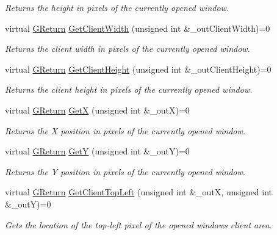 \begin{DoxyCompactItemize}
\begin{DoxyCompactList}\small\item\em Returns the height in pixels of the currently opened window. \end{DoxyCompactList}\item 
virtual \mbox{\hyperlink{namespaceGW_a67a839e3df7ea8a5c5686613a7a3de21}{G\+Return}} \mbox{\hyperlink{classGW_1_1SYSTEM_1_1GWindow_a6cedaf7ca08ed3519092196a8ae79784}{Get\+Client\+Width}} (unsigned int \&\+\_\+out\+Client\+Width)=0
\begin{DoxyCompactList}\small\item\em Returns the client width in pixels of the currently opened window. \end{DoxyCompactList}\item 
virtual \mbox{\hyperlink{namespaceGW_a67a839e3df7ea8a5c5686613a7a3de21}{G\+Return}} \mbox{\hyperlink{classGW_1_1SYSTEM_1_1GWindow_aca175a29d6e87e4d4ed848325216c8f1}{Get\+Client\+Height}} (unsigned int \&\+\_\+out\+Client\+Height)=0
\begin{DoxyCompactList}\small\item\em Returns the client height in pixels of the currently opened window. \end{DoxyCompactList}\item 
virtual \mbox{\hyperlink{namespaceGW_a67a839e3df7ea8a5c5686613a7a3de21}{G\+Return}} \mbox{\hyperlink{classGW_1_1SYSTEM_1_1GWindow_a61da1f01be5fa48df2375701ed0062e9}{GetX}} (unsigned int \&\+\_\+outX)=0
\begin{DoxyCompactList}\small\item\em Returns the X position in pixels of the currently opened window. \end{DoxyCompactList}\item 
virtual \mbox{\hyperlink{namespaceGW_a67a839e3df7ea8a5c5686613a7a3de21}{G\+Return}} \mbox{\hyperlink{classGW_1_1SYSTEM_1_1GWindow_a58d456c963afd1b4d9235a1336d57754}{GetY}} (unsigned int \&\+\_\+outY)=0
\begin{DoxyCompactList}\small\item\em Returns the Y position in pixels of the currently opened window. \end{DoxyCompactList}\item 
virtual \mbox{\hyperlink{namespaceGW_a67a839e3df7ea8a5c5686613a7a3de21}{G\+Return}} \mbox{\hyperlink{classGW_1_1SYSTEM_1_1GWindow_ac80bfaba809d5eb54d6a11b11deddeb7}{Get\+Client\+Top\+Left}} (unsigned int \&\+\_\+outX, unsigned int \&\+\_\+outY)=0
\begin{DoxyCompactList}\small\item\em Gets the location of the top-\/left pixel of the opened window\textquotesingle{}s client area. \end{DoxyCompactList}\item 

\end{DoxyCompactItemize}
